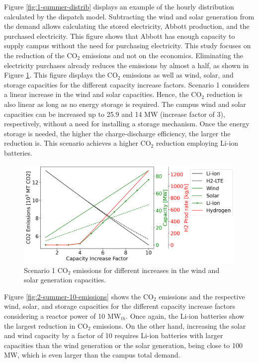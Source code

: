 \documentclass{anstrans}
\begin{document}
Figure \ref{fig:1-summer-distrib} displays an example of the hourly distribution calculated by the dispatch model.
Subtracting the wind and solar generation from the demand allows calculating the stored electricity, Abbott production, and the purchased electricity.
This figure shows that Abbott has enough capacity to supply campus without the need for purchasing electricity.
This study focuses on the reduction of the CO$_2$ emissions and not on the economics.
Eliminating the electricity purchases already reduces the emissions by almost a half, as shown in Figure \ref{fig:1-summer-emissions}.
This figure displays the CO$_2$ emissions as well as wind, solar, and storage capacities for the different capacity increase factors.
Scenario 1 considers a linear increase in the wind and solar capacities.
Hence, the CO$_2$ reduction is also linear as long as no energy storage is required.
The campus wind and solar capacities can be increased up to 25.9 and 14 MW (increase factor of 3), respectively, without a need for installing a storage mechanism.
Once the energy storage is needed, the higher the charge-discharge efficiency, the larger the reduction is.
This scenario achieves a higher CO$_2$ reduction employing Li-ion batteries.

\begin{figure}[htbp!] %
    \centering
    \includegraphics[width=0.99\linewidth]{figures/scenario1-summerA}
    \hfill
    \caption{Scenario 1 CO$_2$ emissions for different increases in the wind and solar generation capacities.}
    \label{fig:1-summer-emissions}
\end{figure}

Figure \ref{fig:2-summer-10-emissions} shows the CO$_2$ emissions and the respective wind, solar, and storage capacities for the different capacity increase factors considering a reactor power of 10 MW$_{th}$.
Once again, the Li-ion batteries show the largest reduction in CO$_2$ emissions.
On the other hand, increasing the solar and wind capacity by a factor of 10 requires Li-ion batteries with larger capacities than the wind generation or the solar generation, being close to 100 MW, which is even larger than the campus total demand.
\end{document}
